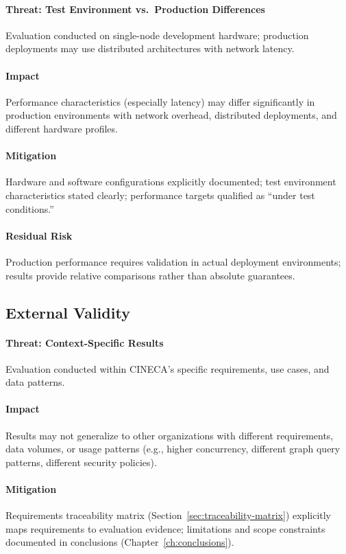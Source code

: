 \documentclass[a4paper,twoside]{sapthesis}
\begin{document}
\paragraph{Threat: Test Environment vs.\ Production Differences}
Evaluation conducted on single-node development hardware; production deployments may use distributed architectures with network latency.

\paragraph{Impact}
Performance characteristics (especially latency) may differ significantly in production environments with network overhead, distributed deployments, and different hardware profiles.

\paragraph{Mitigation}
Hardware and software configurations explicitly documented; test environment characteristics stated clearly; performance targets qualified as ``under test conditions.''

\paragraph{Residual Risk}
Production performance requires validation in actual deployment environments; results provide relative comparisons rather than absolute guarantees.

\subsection{External Validity}

\paragraph{Threat: Context-Specific Results}
Evaluation conducted within CINECA's specific requirements, use cases, and data patterns.

\paragraph{Impact}
Results may not generalize to other organizations with different requirements, data volumes, or usage patterns (e.g., higher concurrency, different graph query patterns, different security policies).

\paragraph{Mitigation}
Requirements traceability matrix (Section~\ref{sec:traceability-matrix}) explicitly maps requirements to evaluation evidence; limitations and scope constraints documented in conclusions (Chapter~\ref{ch:conclusions}).
\end{document}
